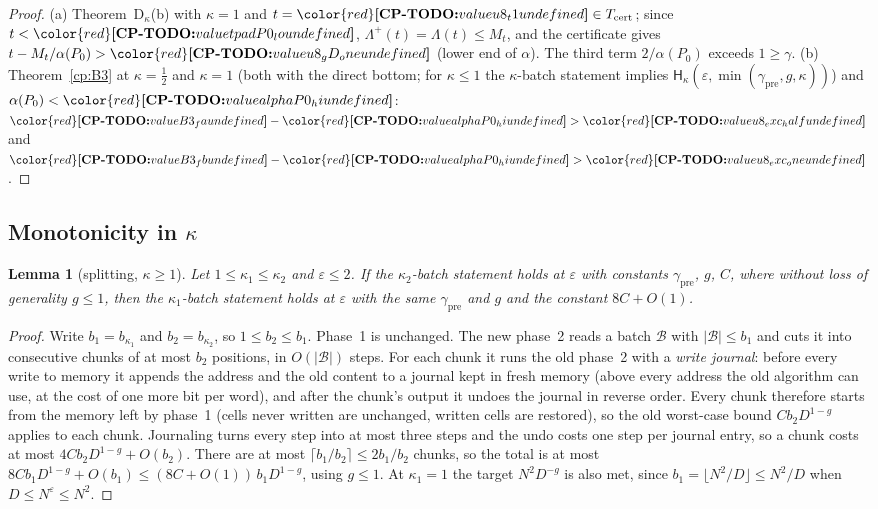 \documentclass[11pt]{article}
\makeatletter
\newtheorem{lemma}[theorem]{Lemma}
\theoremstyle{definition}
\theoremstyle{remark}
\DeclareRobustCommand{\CPTODO}[1]{{\color{red}\textbf{[CP-TODO:} #1\textbf{]}}}
\providecommand{\eps}{\varepsilon}
\newcommand{\abs}[1]{\lvert #1\rvert}
\newcommand{\Hypk}[1]{\mathsf{H}_{#1}}        %
\newcommand{\Lam}{\Lambda}                    %
\newcommand{\Lamp}{\Lambda^{+}}               %
\newcommand{\ThmDk}{Theorem~D\texorpdfstring{\ensuremath{_\kappa}}{\_kappa}}     %
\newcommand{\Pzero}{P_0}                      %
\newcommand{\Tcert}{T_{\mathrm{cert}}}               %
\newcommand{\Bt}{\mathcal B}                         %
\newcommand{\cpv}[1]{\ifcsname cpv@#1\endcsname\csname cpv@#1\endcsname\else\CPTODO{value #1 undefined}\fi}
\makeatother
\begin{document}
\begin{proof}
(a) \ThmDk{}(b) with $\kappa=1$ and $t=\cpv{u8_t1}\in\Tcert$; since $t<\cpv{tpadP0_lo}$, $\Lamp(t)=\Lam(t)\le M_t$, and the certificate gives $t-M_t/\alpha(\Pzero)>\cpv{u8_gD_one}$ (lower end of $\alpha$). The third term $2/\alpha(\Pzero)$ exceeds $1\ge\gamma$. (b) Theorem~\ref{cp:B3} at $\kappa=\frac12$ and $\kappa=1$ (both with the direct bottom; for $\kappa\le1$ the $\kappa$-batch statement implies $\Hypk\kappa(\eps,\min(\gamma_{\mathrm{pre}},g,\kappa))$) and $\alpha(\Pzero)<\cpv{alphaP0_hi}$: $\cpv{B3_fa}-\cpv{alphaP0_hi}>\cpv{u8_exc_half}$ and $\cpv{B3_fb}-\cpv{alphaP0_hi}>\cpv{u8_exc_one}$.
\end{proof}

\subsection{Monotonicity in \texorpdfstring{$\kappa$}{kappa}}\label{cp:sec:mono}

\begin{lemma}[splitting, $\kappa\ge1$]\label{cp:B4}
Let $1\le\kappa_1\le\kappa_2$ and $\eps\le2$. If the $\kappa_2$-batch statement holds at $\eps$ with constants $\gamma_{\mathrm{pre}}$, $g$, $C$, where without loss of generality $g\le1$, then the $\kappa_1$-batch statement holds at $\eps$ with the same $\gamma_{\mathrm{pre}}$ and $g$ and the constant $8C+O(1)$.
\end{lemma}

\begin{proof}
Write $b_1=b_{\kappa_1}$ and $b_2=b_{\kappa_2}$, so $1\le b_2\le b_1$. Phase~1 is unchanged. The new phase~2 reads a batch $\Bt$ with $\abs\Bt\le b_1$ and cuts it into consecutive chunks of at most $b_2$ positions, in $O(\abs\Bt)$ steps. For each chunk it runs the old phase~2 with a \emph{write journal}: before every write to memory it appends the address and the old content to a journal kept in fresh memory (above every address the old algorithm can use, at the cost of one more bit per word), and after the chunk's output it undoes the journal in reverse order. Every chunk therefore starts from the memory left by phase~1 (cells never written are unchanged, written cells are restored), so the old worst-case bound $Cb_2D^{1-g}$ applies to each chunk. Journaling turns every step into at most three steps and the undo costs one step per journal entry, so a chunk costs at most $4Cb_2D^{1-g}+O(b_2)$. There are at most $\lceil b_1/b_2\rceil\le2b_1/b_2$ chunks, so the total is at most $8Cb_1D^{1-g}+O(b_1)\le(8C+O(1))\,b_1D^{1-g}$, using $g\le1$. At $\kappa_1=1$ the target $N^2D^{-g}$ is also met, since $b_1=\lfloor N^2/D\rfloor\le N^2/D$ when $D\le N^\eps\le N^2$.
\end{proof}
\end{document}
